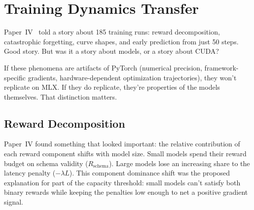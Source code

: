 \documentclass[11pt]{article}
\begin{document}
\section{Training Dynamics Transfer}
\label{sec:dynamics}

Paper~IV~\citep{maloney2025dynamics} told a story about 185 training runs: reward decomposition, catastrophic forgetting, curve shapes, and early prediction from just 50 steps.  Good story.  But was it a story about models, or a story about CUDA?

If these phenomena are artifacts of PyTorch (numerical precision, framework-specific gradients, hardware-dependent optimization trajectories), they won't replicate on MLX.  If they do replicate, they're properties of the models themselves.  That distinction matters.

\subsection{Reward Decomposition}
\label{sec:reward-decomp}

Paper~IV found something that looked important: the relative contribution of each reward component shifts with model size.  Small models spend their reward budget on schema validity ($R_{\text{schema}}$).  Large models lose an increasing share to the latency penalty ($-\lambda L$).  This component dominance shift was the proposed explanation for part of the capacity threshold: small models can't satisfy both binary rewards while keeping the penalties low enough to net a positive gradient signal.
\end{document}
